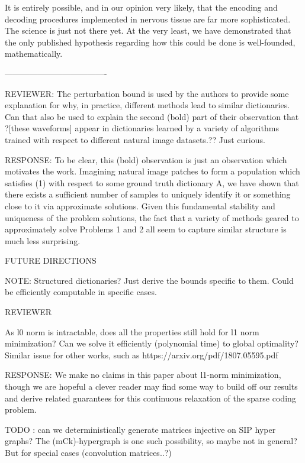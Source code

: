 It is entirely possible, and in our opinion very likely, that the encoding and decoding procedures implemented in nervous tissue are far more sophisticated. The science is just not there yet. At the very least, we have demonstrated that the only published hypothesis regarding how this could be done is well-founded, mathematically.

-------------------------------------

REVIEWER:
The perturbation bound is used by the authors to provide some explanation for why, in practice, different methods lead to similar dictionaries. Can that also be used to explain the second (bold) part of their observation that ?[these waveforms] appear in dictionaries learned by a variety of algorithms trained with respect to different natural image datasets.?? Just curious.

RESPONSE:
To be clear, this (bold) observation is just an observation which motivates the work. Imagining natural image patches to form a population which satisfies (1) with respect to some ground truth dictionary A, we have shown that there exists a sufficient number of samples to uniquely identify it or something close to it via approximate solutions. Given this fundamental stability and uniqueness of the problem solutions, the fact that a variety of methods geared to approximately solve Problems 1 and 2 all seem to capture similar structure is much less surprising. 



FUTURE DIRECTIONS

NOTE: Structured dictionaries? Just derive the bounds specific to them. Could be efficiently computable in specific cases.

REVIEWER

As l0 norm is intractable, does all the properties still hold for l1 norm minimization? Can we solve it efficiently (polynomial time) to global optimality? Similar issue for other works, such as
https://arxiv.org/pdf/1807.05595.pdf

RESPONSE:
We make no claims in this paper about l1-norm minimization, though we are hopeful a clever reader may find some way to build off our results and derive related guarantees for this continuous relaxation of the sparse coding problem.


TODO : can we deterministically generate matrices injective on SIP hyper graphs? The (mCk)-hypergraph is one such possibility, so maybe not in general? But for special cases (convolution matrices..?)

